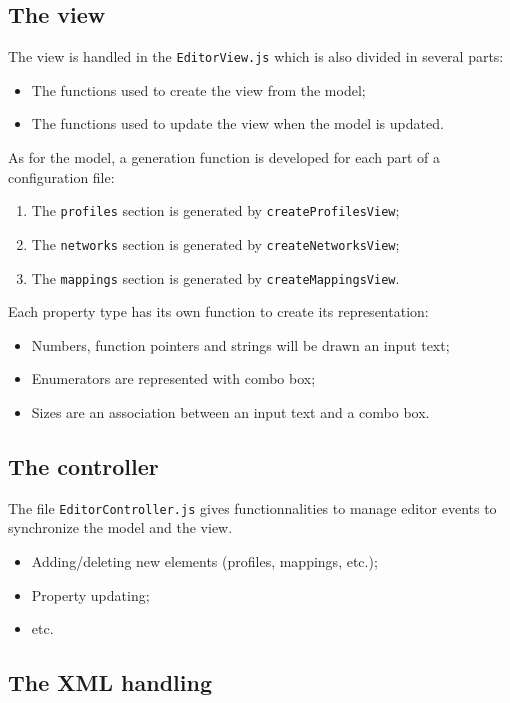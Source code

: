\documentclass{article}
\begin{document}
\subsection{The view}

The view is handled in the \texttt{EditorView.js} which is also divided in several parts:
\begin{itemize}
\item The functions used to create the view from the model;
\item The functions used to update the view when the model is updated.
\end{itemize}

\noindent As for the model, a generation function is developed for each part of a configuration file:
\begin{enumerate}
\item The \texttt{profiles} section is generated by \texttt{createProfilesView};
\item The \texttt{networks} section is generated by \texttt{createNetworksView};
\item The \texttt{mappings} section is generated by \texttt{createMappingsView}.
\end{enumerate}

\noindent Each property type has its own function to create its representation:
\begin{itemize}
\item Numbers, function pointers and strings will be drawn an input text;
\item Enumerators are represented with combo box;
\item Sizes are an association between an input text and a combo box.
\end{itemize}

\subsection{The controller}

The file \texttt{EditorController.js} gives functionnalities to manage editor events to synchronize the model and the view.
\begin{itemize}
\item Adding/deleting new elements (profiles, mappings, etc.);
\item Property updating;
\item etc.
\end{itemize}

\subsection{The XML handling}
\end{document}
